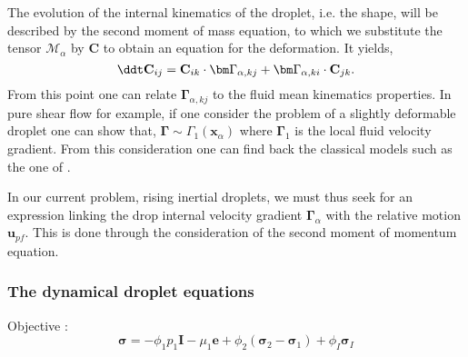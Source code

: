 The evolution of the internal kinematics   of the droplet, i.e. the shape, will be described by the second moment of mass equation, to which we substitute the tensor $\mathcal{M}_\alpha$ by \textbf{C} to obtain an equation for the deformation. 
It yields, 
\begin{equation*}
    \ddt \textbf{C}_{ij}
    = \textbf{C}_{ik} \cdot \bm\Gamma_{\alpha,kj}
    +  \bm\Gamma_{\alpha,ki} \cdot \textbf{C}_{jk}.
    \label{eq:dt_C}
\end{equation*}
From this point one can relate $\bm\Gamma_{\alpha,kj}$ to the fluid mean kinematics   properties. 
In pure shear flow for example, if one consider the problem of a slightly deformable droplet one can show that, $\bm\Gamma \sim \Gamma_1(\textbf{x}_\alpha)$ where $\bm\Gamma_1$ is the local fluid velocity gradient.
From this consideration one can find back the classical models such as the one of  \citet{maffettone1998equation,schowalter1968rheological}. 

In our current problem, rising inertial droplets, we must thus seek for an expression linking the drop internal velocity gradient $\bm\Gamma_\alpha$ with the relative motion $\textbf{u}_{pf}$. 
This is done through the consideration of the second moment of momentum equation. 

\subsubsection*{The dynamical droplet equations}

Objective : 
\begin{equation*}
    \bm\sigma 
    = 
    - \phi_1 p_1 \textbf{I}
    - \mu_1 \textbf{e}
    + \phi_2(\bm\sigma_2 - \bm\sigma_1)
    + \phi_I\bm\sigma_I
\end{equation*}

